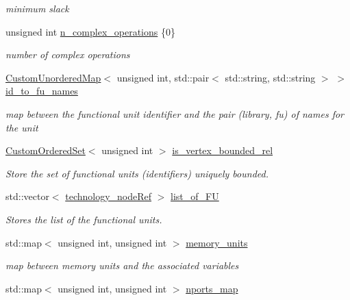 \begin{DoxyCompactItemize}
\begin{DoxyCompactList}\small\item\em minimum slack \end{DoxyCompactList}\item 
unsigned int \hyperlink{classAllocationInformation_aaa957dd7b3b6bd358aa029dac21a18ef}{n\+\_\+complex\+\_\+operations} \{0\}
\begin{DoxyCompactList}\small\item\em number of complex operations \end{DoxyCompactList}\item 
\hyperlink{custom__map_8hpp_ad1ed68f2ff093683ab1a33522b144adc}{Custom\+Unordered\+Map}$<$ unsigned int, std\+::pair$<$ std\+::string, std\+::string $>$ $>$ \hyperlink{classAllocationInformation_ad32f768daab8ad53b753be8fd23642b3}{id\+\_\+to\+\_\+fu\+\_\+names}
\begin{DoxyCompactList}\small\item\em map between the functional unit identifier and the pair (library, fu) of names for the unit \end{DoxyCompactList}\item 
\hyperlink{classCustomOrderedSet}{Custom\+Ordered\+Set}$<$ unsigned int $>$ \hyperlink{classAllocationInformation_a8f7512d362462641f5811475a58c473b}{is\+\_\+vertex\+\_\+bounded\+\_\+rel}
\begin{DoxyCompactList}\small\item\em Store the set of functional units (identifiers) uniquely bounded. \end{DoxyCompactList}\item 
std\+::vector$<$ \hyperlink{technology__node_8hpp_a33dd193b7bd6b987bf0d8a770a819fa7}{technology\+\_\+node\+Ref} $>$ \hyperlink{classAllocationInformation_ac92354f2ac838515e25fc32f48cdba1a}{list\+\_\+of\+\_\+\+FU}
\begin{DoxyCompactList}\small\item\em Stores the list of the functional units. \end{DoxyCompactList}\item 
std\+::map$<$ unsigned int, unsigned int $>$ \hyperlink{classAllocationInformation_a09a1bd53db3029f3b557ce607d1ff547}{memory\+\_\+units}
\begin{DoxyCompactList}\small\item\em map between memory units and the associated variables \end{DoxyCompactList}\item 
std\+::map$<$ unsigned int, unsigned int $>$ \hyperlink{classAllocationInformation_a7a306a3cfbcbc1ca4878ad0556d97942}{nports\+\_\+map}

\end{DoxyCompactItemize}
